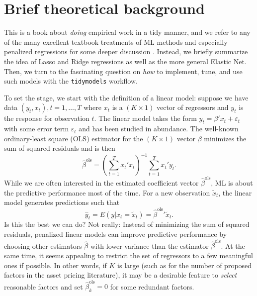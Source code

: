 \documentclass[
]{krantz}
\begin{document}
\hypertarget{brief-theoretical-background}{%
\section{Brief theoretical background}\label{brief-theoretical-background}}

This is a book about \emph{doing} empirical work in a tidy manner, and we refer to any of the many excellent textbook treatments of ML methods and especially penalized regressions for some deeper discussion \citep[e.g.,][\citet{Hastie2013}, \citet{DePrado2018}]{Hastie2009}. Instead, we briefly summarize the idea of Lasso and Ridge regressions as well as the more general Elastic Net. Then, we turn to the fascinating question on \emph{how} to implement, tune, and use such models with the \texttt{tidymodels} workflow.

To set the stage, we start with the definition of a linear model: suppose we have data \((y_t, x_t), t = 1,\ldots, T\) where \(x_t\) is a \((K \times 1)\) vector of regressors and \(y_t\) is the response for observation \(t\).
The linear model takes the form \(y_t = \beta' x_t + \varepsilon_t\) with some error term \(\varepsilon_t\) and has been studied in abundance. The well-known ordinary-least square (OLS) estimator for the \((K \times 1)\) vector \(\beta\) minimizes the sum of squared residuals and is then \[\hat{\beta}^\text{ols} = \left(\sum\limits_{t=1}^T x_t'x_t\right)^{-1} \sum\limits_{t=1}^T x_t'y_t.\]
While we are often interested in the estimated coefficient vector \(\hat\beta^\text{ols}\), ML is about the predictive performance most of the time. For a new observation \(\tilde{x}_t\), the linear model generates predictions such that \[\hat y_t = E\left(y|x_t = \tilde x_t\right) = \hat\beta^\text{ols}{}' \tilde x_t.\]
Is this the best we can do?
Not really: Instead of minimizing the sum of squared residuals, penalized linear models can improve predictive performance by choosing other estimators \(\hat{\beta}\) with lower variance than the estimator \(\hat\beta^\text{ols}\).
At the same time, it seems appealing to restrict the set of regressors to a few meaningful ones if possible. In other words, if \(K\) is large (such as for the number of proposed factors in the asset pricing literature), it may be a desirable feature to \emph{select} reasonable factors and set \(\hat\beta^{\text{ols}}_k = 0\) for some redundant factors.
\end{document}
